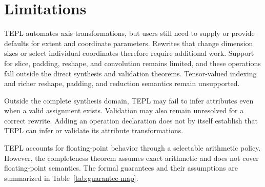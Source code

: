 \section{Limitations}
\label{sec:scope-limitations}
TEPL automates axis transformations, but users still need to supply
or provide defaults for extent and coordinate parameters. Rewrites
that change dimension sizes or select individual coordinates therefore
require additional work. Support for slice, padding, reshape, and
convolution remains limited, and these operations fall outside the
direct synthesis and validation theorems. Tensor-valued indexing
and richer reshape, padding, and reduction semantics remain unsupported.

Outside the complete synthesis domain, TEPL may fail to infer
attributes even when a valid assignment exists. Validation may also
remain unresolved for a correct rewrite. Adding an operation declaration
does not by itself establish that TEPL can infer or validate its
attribute transformations.

TEPL accounts for floating-point behavior through a selectable
arithmetic policy. However, the completeness theorem assumes exact
arithmetic and does not cover floating-point semantics.
The formal guarantees and their assumptions are summarized in
Table~\ref{tab:guarantee-map}.
